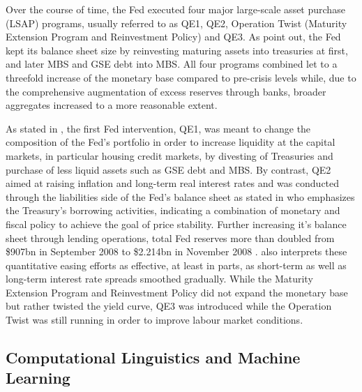 Over the course of time, the Fed executed four major large-scale asset purchase (LSAP) programs, usually referred to as QE1, QE2, Operation Twist (Maturity Extension Program and
Reinvestment Policy) and QE3. As \textcite{Fawley.2013} point out, the Fed kept its balance sheet size by reinvesting maturing assets into treasuries at first, and later MBS and GSE debt into MBS. All four programs combined let to a threefold increase of the monetary base compared to pre-crisis levels while, due to the comprehensive augmentation of excess reserves through banks, broader aggregates increased to a more reasonable extent. 

As stated in \textcite{Blinder.2010}, the first Fed intervention, QE1, was meant to change the composition of the Fed's portfolio in order to increase liquidity at the capital markets, in particular housing credit markets, by divesting of Treasuries and purchase of less liquid assets such as GSE debt and MBS. %
By contrast, QE2 aimed at raising inflation and long-term real interest rates and was conducted through the liabilities side of the Fed's balance sheet as stated in \textcite{Blinder.2010} who emphasizes the Treasury's borrowing activities, indicating a combination of monetary and fiscal policy to achieve the goal of price stability. Further increasing it's balance sheet through lending operations, total Fed reserves more than doubled from \$907bn in September 2008 to \$2.214bn in November 2008 \cite[p.~468]{Blinder.2010}. \textcite{Blinder.2010} also interprets these quantitative easing efforts as effective, at least in parts, as short-term as well as long-term interest rate spreads smoothed gradually.
While the Maturity Extension Program and Reinvestment Policy did not expand the monetary base but rather twisted the yield curve, QE3 was introduced while the Operation Twist was still running in order to improve labour market conditions.



\subsection{Computational Linguistics and Machine Learning}

